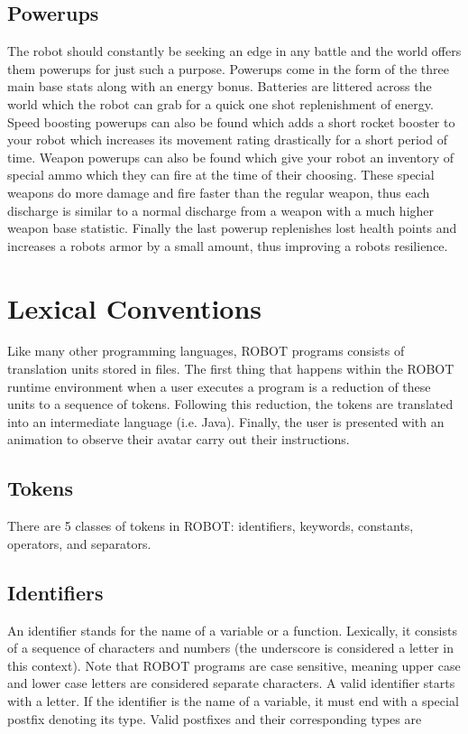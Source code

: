\documentclass[a4paper]{article}
\begin{document}
\subsection{Powerups}

The robot should constantly be seeking an edge in any battle and the world offers them powerups for just such a purpose. Powerups come in the form of the three main base stats along with an energy bonus. Batteries are littered across the world which the robot can grab for a quick one shot replenishment of energy. Speed boosting powerups can also be found which adds a short rocket booster to your robot which increases its movement rating drastically for a short period of time. Weapon powerups can also be found which give your robot an inventory of special ammo which they can fire at the time of their choosing. These special weapons do more damage and fire faster than the regular weapon, thus each discharge is similar to a normal discharge from a weapon with a much higher weapon base statistic. Finally the last powerup replenishes lost health points and increases a robots armor by a small amount, thus improving a robots resilience.

\section{Lexical Conventions}

Like many other programming languages, ROBOT programs consists of translation units stored in files.  The first thing that happens within the ROBOT runtime environment when a user executes a program is a reduction of these units to a sequence of tokens.  Following this reduction, the tokens are translated into an intermediate language (i.e. Java). Finally, the user is presented with an animation to observe their avatar carry out their instructions.

\subsection{Tokens}

There are 5 classes of tokens in ROBOT: identifiers, keywords, constants, operators, and separators.

\subsection{Identifiers}

An identifier stands for the name of a variable or a function.  Lexically, it consists of a sequence of characters and numbers (the underscore is considered a letter in this context).  Note that ROBOT programs are case sensitive, meaning upper case and lower case letters are considered separate characters.  A valid identifier starts with a letter.  If the identifier is the name of a variable, it must end with a special postfix denoting its type.  Valid postfixes and their corresponding types are
\end{document}
